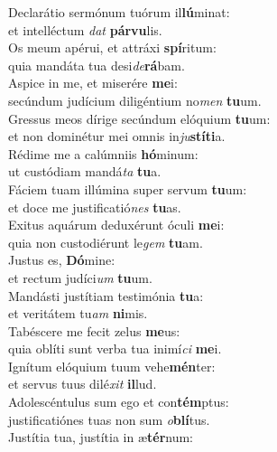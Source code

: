 \evenverse Declarátio sermónum tuórum il\textbf{lú}minat:~\*\\
\evenverse et intelléctum \textit{dat} \textbf{pár}\textbf{vu}lis.\\
\oddverse Os meum apérui, et attráxi \textbf{spí}ritum:~\*\\
\oddverse quia mandáta tua desi\textit{de}\textbf{rá}bam.\\
\evenverse Aspice in me, et miserére \textbf{me}i:~\*\\
\evenverse secúndum judícium diligéntium no\textit{men} \textbf{tu}um.\\
\oddverse Gressus meos dírige secúndum elóquium \textbf{tu}um:~\*\\
\oddverse et non dominétur mei omnis in\textit{ju}\textbf{stí}\textbf{ti}a.\\
\evenverse Rédime me a calúmniis \textbf{hó}minum:~\*\\
\evenverse ut custódiam mandá\textit{ta} \textbf{tu}a.\\
\oddverse Fáciem tuam illúmina super servum \textbf{tu}um:~\*\\
\oddverse et doce me justificatió\textit{nes} \textbf{tu}as.\\
\evenverse Exitus aquárum deduxérunt óculi \textbf{me}i:~\*\\
\evenverse quia non custodiérunt le\textit{gem} \textbf{tu}am.\\
\oddverse Justus es, \textbf{Dó}mine:~\*\\
\oddverse et rectum judíci\textit{um} \textbf{tu}um.\\
\evenverse Mandásti justítiam testimónia \textbf{tu}a:~\*\\
\evenverse et veritátem tu\textit{am} \textbf{ni}mis.\\
\oddverse Tabéscere me fecit zelus \textbf{me}us:~\*\\
\oddverse quia oblíti sunt verba tua inimí\textit{ci} \textbf{me}i.\\
\evenverse Ignítum elóquium tuum vehe\textbf{mén}ter:~\*\\
\evenverse et servus tuus dilé\textit{xit} \textbf{il}lud.\\
\oddverse Adolescéntulus sum ego et con\textbf{tém}ptus:~\*\\
\oddverse justificatiónes tuas non sum \textit{o}\textbf{blí}tus.\\
\evenverse Justítia tua, justítia in æ\textbf{tér}num:~\*\\
